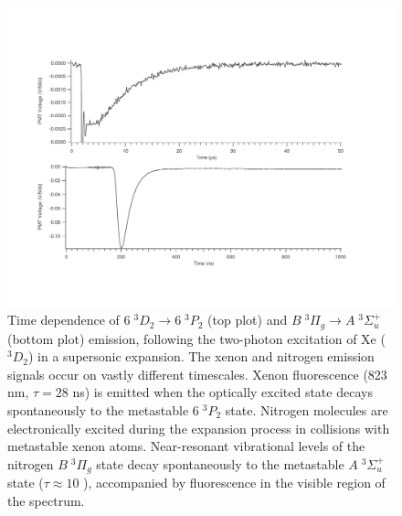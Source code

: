 \documentclass[12pt]{mitthesis}
\begin{document}
\begin{figure}
  \caption{Time dependence of  $6\;^3D_2 \rightarrow 6\;^3P_2$
    (top plot) and  $B \; ^3\Pi_g \rightarrow A \; ^3\Sigma_u^+$ (bottom
    plot) emission, following the two-photon excitation of Xe
    ($^3D_2$) in a supersonic expansion.  The xenon and nitrogen
    emission signals occur on vastly different timescales.  Xenon
    fluorescence (823 nm, $\tau=28$ ns) is emitted when the optically
    excited state decays spontaneously to the metastable $6\;^3P_2$
    state.  Nitrogen molecules are electronically excited during the
    expansion process in collisions with metastable xenon atoms.
    Near-resonant vibrational levels of the nitrogen $B \; ^3\Pi_g$
    state decay spontaneously to the metastable $A \; ^3\Sigma_u^+$
    state ($\tau \approx 10$ \microsec), accompanied by fluorescence
    in the visible region of the spectrum. }
  \label{fig:xen2-traces}
  \centering
  \includegraphics[width=7.7in,angle=90,trim=0 0 1in 1cm ]{XeN2-traces.pdf}
\end{figure}





\end{document}
